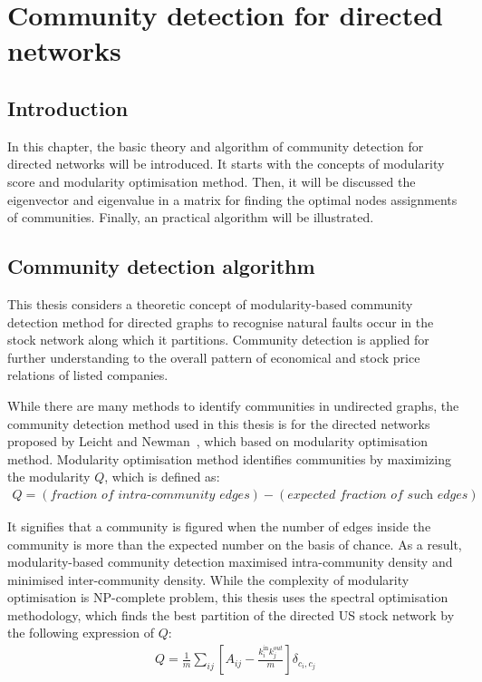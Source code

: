 \chapter{Community detection for directed networks}
\label{cpt:community}
\section{Introduction}
In this chapter, the basic theory and algorithm of community detection for directed networks will be introduced. It starts with the concepts of modularity score and modularity optimisation method. Then, it will be discussed the eigenvector and eigenvalue in a matrix for finding the optimal nodes assignments of communities. Finally, an practical algorithm will be illustrated.

\section{Community detection algorithm}
This thesis considers a theoretic concept of modularity-based community detection method for directed graphs to recognise natural faults occur in the stock network along which it partitions. Community detection is applied for further understanding to the overall pattern of economical and stock price relations of listed companies.

While there are many methods to identify communities in undirected graphs, the community detection method used in this thesis is for the directed networks proposed by Leicht and Newman~\cite{PhysRevLett.100.118703}, which based on modularity optimisation method. Modularity optimisation method identifies communities by maximizing the modularity $Q$, which is defined as:
\begin{eqnarray}
Q=(\textit{fraction of intra-community edges}) - (\textit{expected fraction of such edges})
\end{eqnarray}

It signifies that a community is figured when the number of edges inside the community is more than the expected number on the basis of chance. As a result, modularity-based community detection maximised intra-community density and minimised inter-community density. While the complexity of modularity optimisation is NP-complete problem, this thesis uses the spectral optimisation methodology, which finds the best partition of the directed US stock network by the following expression of $Q$:
\begin{eqnarray}
Q=\frac{1}{m}\sum_{ij}{\left[A_{ij}-\frac{k_i^{\text{in}}k_j^{out}}{m}\right]}\delta_{c_i,c_j}
\end{eqnarray}

